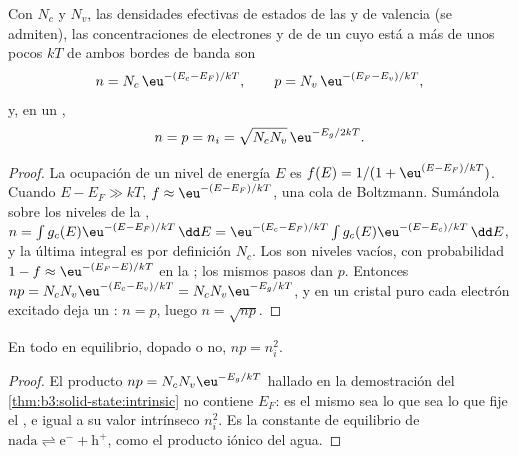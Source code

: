 \begin{theorem}\label{thm:b3:solid-state:intrinsic}
Con $N_c$ y $N_v$, las densidades efectivas de estados de las  y de
valencia (se admiten), las concentraciones de electrones y de  de un 
cuyo  está a más de unos pocos $kT$ de ambos bordes de banda son
\[
  n = N_c\,\eu^{-(E_c - E_F)/kT}, \qquad p = N_v\,\eu^{-(E_F - E_v)/kT},
\]
y, en un ,
\[
  n = p = n_i = \sqrt{N_cN_v}\,\eu^{-E_g/2kT}.
\]
\end{theorem}

\begin{proof}
La ocupación de un nivel de energía $E$ es $f(E) = 1/(1 + \eu^{(E - E_F)/kT})$. Cuando
$E - E_F \gg kT$, $f \approx \eu^{-(E - E_F)/kT}$, una cola de Boltzmann. Sumándola sobre los niveles de la , $n = \int g_c(E)\eu^{-(E - E_F)/kT}\,\dd E = \eu^{-(E_c - E_F)/kT}\int g_c(E)\eu^{-(E - E_c)/kT}\,\dd E$, y la última integral es por
definición $N_c$. Los  son niveles vacíos, con probabilidad $1 - f \approx \eu^{-(E_F - E)/kT}$ en la
; los mismos pasos dan $p$. Entonces $np = N_cN_v\eu^{-(E_c - E_v)/kT} = N_cN_v\eu^{-E_g/kT}$, y en un cristal puro
cada electrón excitado deja un : $n = p$, luego $n = \sqrt{np}$.
\end{proof}

\begin{proposition}\label{prop:b3:solid-state:mass-action}
En todo  en equilibrio, dopado o no, $np = n_i^2$.
\end{proposition}

\begin{proof}
El producto $np = N_cN_v\eu^{-E_g/kT}$ hallado en la demostración del
\cref{thm:b3:solid-state:intrinsic} no contiene $E_F$: es el mismo sea lo que sea lo que
fije el , e igual a su valor intrínseco $n_i^2$. Es la
constante de equilibrio de $\text{nada} \rightleftharpoons \mathrm e^- + \mathrm h^+$, como el producto iónico del agua.
\end{proof}

